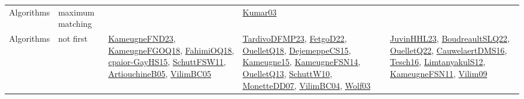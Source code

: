 {\begin{longtable}{lp{3cm}>{\raggedright}p{6cm}>{\raggedright}p{6cm}p{8cm}}
Algorithms & maximum matching &  & \href{papers/Kumar03.pdf}{Kumar03}\cite{Kumar03} & \\
Algorithms & not first & \href{papers/KameugneFND23.pdf}{KameugneFND23}\cite{KameugneFND23}, \href{papers/KameugneFGOQ18.pdf}{KameugneFGOQ18}\cite{KameugneFGOQ18}, \href{articles/FahimiOQ18.pdf}{FahimiOQ18}\cite{FahimiOQ18}, \href{papers/cpaior-GayHS15.pdf}{cpaior-GayHS15}\cite{cpaior-GayHS15}, \href{articles/SchuttFSW11.pdf}{SchuttFSW11}\cite{SchuttFSW11}, \href{papers/ArtiouchineB05.pdf}{ArtiouchineB05}\cite{ArtiouchineB05}, \href{articles/VilimBC05.pdf}{VilimBC05}\cite{VilimBC05} & \href{papers/TardivoDFMP23.pdf}{TardivoDFMP23}\cite{TardivoDFMP23}, \href{articles/FetgoD22.pdf}{FetgoD22}\cite{FetgoD22}, \href{papers/OuelletQ18.pdf}{OuelletQ18}\cite{OuelletQ18}, \href{papers/DejemeppeCS15.pdf}{DejemeppeCS15}\cite{DejemeppeCS15}, \href{articles/Kameugne15.pdf}{Kameugne15}\cite{Kameugne15}, \href{articles/KameugneFSN14.pdf}{KameugneFSN14}\cite{KameugneFSN14}, \href{papers/OuelletQ13.pdf}{OuelletQ13}\cite{OuelletQ13}, \href{papers/SchuttW10.pdf}{SchuttW10}\cite{SchuttW10}, \href{papers/MonetteDD07.pdf}{MonetteDD07}\cite{MonetteDD07}, \href{papers/VilimBC04.pdf}{VilimBC04}\cite{VilimBC04}, \href{papers/Wolf03.pdf}{Wolf03}\cite{Wolf03} & \href{papers/JuvinHHL23.pdf}{JuvinHHL23}\cite{JuvinHHL23}, \href{papers/BoudreaultSLQ22.pdf}{BoudreaultSLQ22}\cite{BoudreaultSLQ22}, \href{papers/OuelletQ22.pdf}{OuelletQ22}\cite{OuelletQ22}, \href{papers/CauwelaertDMS16.pdf}{CauwelaertDMS16}\cite{CauwelaertDMS16}, \href{papers/Tesch16.pdf}{Tesch16}\cite{Tesch16}, \href{articles/LimtanyakulS12.pdf}{LimtanyakulS12}\cite{LimtanyakulS12}, \href{papers/KameugneFSN11.pdf}{KameugneFSN11}\cite{KameugneFSN11}, \href{papers/Vilim09.pdf}{Vilim09}\cite{Vilim09}\\

\end{longtable}}
